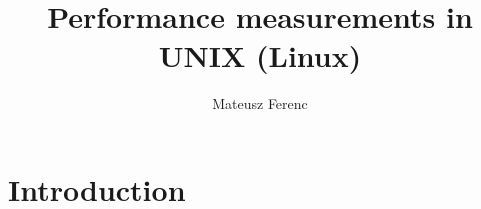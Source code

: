 \documentclass[11pt,twocolumn]{article}
\title{Performance measurements in UNIX (Linux)}
\author{Mateusz Ferenc}
\date{}
\begin{document}
	
\maketitle
	
\section*{Introduction}
\end{document}
